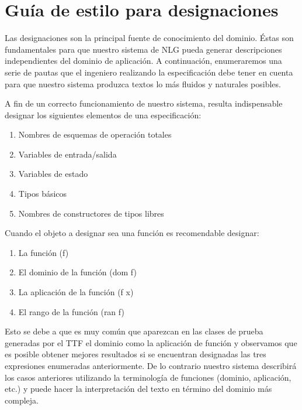 \chapter{Guía de estilo para designaciones}
\label{ape:designaciones}

Las designaciones son la principal fuente de conocimiento del dominio. Éstas son fundamentales para que nuestro sistema de NLG pueda generar descripciones independientes del dominio de aplicación. A continuación, enumeraremos una serie de pautas que el ingeniero realizando la especificación debe tener en cuenta para que nuestro sistema produzca textos lo más fluidos y naturales posibles.

\bigskip
A fin de un correcto funcionamiento de nuestro sistema, resulta indispensable designar los siguientes elementos de una especificación:

\bigskip
\begin{enumerate}
	\item Nombres de esquemas de operación totales
	\item Variables de entrada/salida
	\item Variables de estado
	\item Tipos básicos
	\item Nombres de constructores de tipos libres
\end{enumerate}

\bigskip
Cuando el objeto a designar sea una función es recomendable designar:

\bigskip
\begin{enumerate}
	\item La función (f)
	\item El dominio de la función (dom f)
	\item La aplicación de la función (f x)
	\item El rango de la función (ran f)
\end{enumerate}

\bigskip
Esto se debe a que es muy común que aparezcan en las clases de prueba generadas por el TTF el dominio como la aplicación de función y observamos que es posible obtener mejores resultados si se encuentran designadas las tres expresiones enumeradas anteriormente. De lo contrario nuestro sistema describirá los casos anteriores utilizando la terminología de funciones (dominio, aplicación, etc.) y puede hacer la interpretación del texto en término del dominio más compleja.
